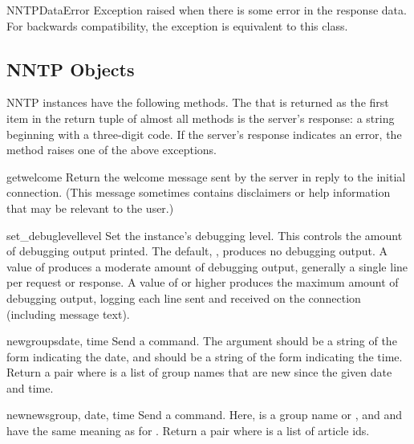 \begin{classdesc}{NNTPDataError}{}
Exception raised when there is some error in the response data.  For
backwards compatibility, the exception  is
equivalent to this class.
\end{classdesc}


\subsection{NNTP Objects \label{nntp-objects}}

NNTP instances have the following methods.  The  that is
returned as the first item in the return tuple of almost all methods
is the server's response: a string beginning with a three-digit code.
If the server's response indicates an error, the method raises one of
the above exceptions.


\begin{methoddesc}{getwelcome}{}
Return the welcome message sent by the server in reply to the initial
connection.  (This message sometimes contains disclaimers or help
information that may be relevant to the user.)
\end{methoddesc}

\begin{methoddesc}{set_debuglevel}{level}
Set the instance's debugging level.  This controls the amount of
debugging output printed.  The default, , produces no debugging
output.  A value of  produces a moderate amount of debugging
output, generally a single line per request or response.  A value of
 or higher produces the maximum amount of debugging output,
logging each line sent and received on the connection (including
message text).
\end{methoddesc}

\begin{methoddesc}{newgroups}{date, time}
Send a  command.  The  argument should be a
string of the form  indicating the
date, and  should be a string of the form
 indicating the time.  Return a pair
 where  is a list of
group names that are new since the given date and time.
\end{methoddesc}

\begin{methoddesc}{newnews}{group, date, time}
Send a  command.  Here,  is a group name or
, and  and  have the same meaning as for
.  Return a pair  where  is a list of article ids.
\end{methoddesc}


